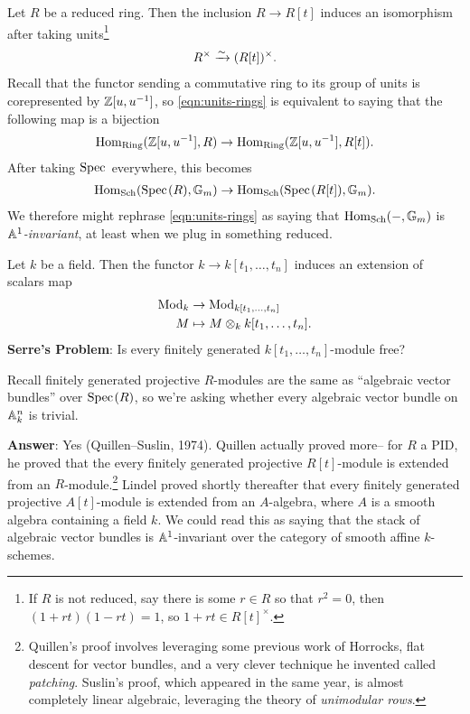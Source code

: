 \documentclass[11pt]{amsart}
\begin{document}
\begin{example} Let $R$ be a reduced ring. Then the inclusion $R \to R[t]$ induces an isomorphism after taking units\footnote{If $R$ is not reduced, say there is some $r\in R$ so that $r^2 = 0$, then $(1+rt)(1-rt) = 1$, so $1+rt\in R[t]^\times$.}
\begin{equation}\label{eqn:units-rings}
\begin{aligned}
    R^\times \xrightarrow{\sim} (R[t])^\times.
\end{aligned}
\end{equation}
Recall that the functor sending a commutative ring to its group of units is corepresented by $\mathbb{Z}[u,u^{-1}]$, so \autoref{eqn:units-rings} is equivalent to saying that the following map is a bijection
\begin{align*}
    \mathrm{Hom}_{\mathrm{Ring}}(\mathbb{Z}[u,u^{-1}],R) \to \mathrm{Hom}_{\mathrm{Ring}}(\mathbb{Z}[u,u^{-1}],R[t]).
\end{align*}
After taking $\text{Spec}\hspace{0.1em}$ everywhere, this becomes
\begin{align*}
    \mathrm{Hom}_{\mathrm{Sch}}(\text{Spec}\hspace{0.1em}(R),\mathbb{G}_m) \to \mathrm{Hom}_{\mathrm{Sch}}(\text{Spec}\hspace{0.1em}(R[t]),\mathbb{G}_m).
\end{align*}
We therefore might rephrase \autoref{eqn:units-rings} as saying that $\mathrm{Hom}_{\mathrm{Sch}}(-,\mathbb{G}_m)$ is \textit{$\mathbb{A}^1$-invariant}, at least when we plug in something reduced.
\end{example}

\begin{example} Let $k$ be a field. Then the functor $k \to k[t_1, \ldots, t_n]$ induces an extension of scalars map
\begin{align*}
    \mathrm{Mod}_k &\to \mathrm{Mod}_{k[t_1, \ldots, t_n]} \\
    M &\mapsto M \otimes_k k[t_1, \ldots, t_n].
\end{align*}
\textbf{Serre's Problem}: Is every finitely generated $k[t_1, \ldots, t_n]$-module free?

Recall finitely generated projective $R$-modules are the same as ``algebraic vector bundles'' over $\text{Spec}\hspace{0.1em}(R)$, so we're asking whether every algebraic vector bundle on $\mathbb{A}^n_k$ is trivial.

\textbf{Answer}: Yes (Quillen--Suslin, 1974). Quillen actually proved more-- for $R$ a PID, he proved that the every finitely generated projective $R[t]$-module is extended from an $R$-module.\footnote{%
Quillen's proof involves leveraging some previous work of Horrocks, flat descent for vector bundles, and a very clever technique he invented called \textit{patching}. Suslin's proof, which appeared in the same year, is almost completely linear algebraic, leveraging the theory of \textit{unimodular rows}.} Lindel proved shortly thereafter that every finitely generated projective $A[t]$-module is extended from an $A$-algebra, where $A$ is a smooth algebra containing a field $k$. We could read this as saying that the stack of algebraic vector bundles is $\mathbb{A}^1$-invariant over the category of smooth affine $k$-schemes.
\end{example}
\end{document}
